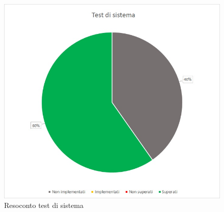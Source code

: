 \renewcommand{\arraystretch}{1}
\begin{figure} [H]
	\centering
	\includegraphics[scale=1]{Img/TS}
	\caption{Resoconto test di sistema}\label{}
\end{figure}
\newpage

